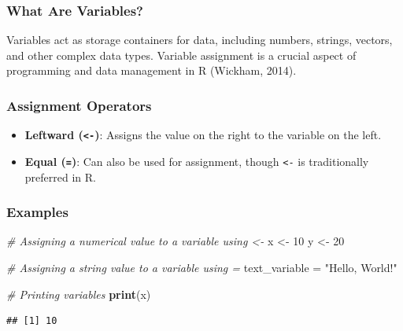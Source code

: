 \documentclass[
  b5paper]{book}
\newenvironment{Shaded}{\begin{snugshade}}{\end{snugshade}}
\newcommand{\CommentTok}[1]{\textcolor[rgb]{0.56,0.35,0.01}{\textit{#1}}}
\newcommand{\DecValTok}[1]{\textcolor[rgb]{0.00,0.00,0.81}{#1}}
\newcommand{\FunctionTok}[1]{\textcolor[rgb]{0.13,0.29,0.53}{\textbf{#1}}}
\newcommand{\NormalTok}[1]{#1}
\newcommand{\OtherTok}[1]{\textcolor[rgb]{0.56,0.35,0.01}{#1}}
\newcommand{\StringTok}[1]{\textcolor[rgb]{0.31,0.60,0.02}{#1}}
\providecommand{\tightlist}{%
  \setlength{\itemsep}{0pt}\setlength{\parskip}{0pt}}
\begin{document}
\hypertarget{what-are-variables}{%
\subsubsection*{What Are Variables?}\label{what-are-variables}}

Variables act as storage containers for data, including numbers, strings, vectors, and other complex data types. Variable assignment is a crucial aspect of programming and data management in R (Wickham, 2014).

\hypertarget{assignment-operators}{%
\subsubsection*{Assignment Operators}\label{assignment-operators}}

\begin{itemize}
\tightlist
\item
  \textbf{Leftward (\texttt{\textless{}-})}: Assigns the value on the right to the variable on the left.
\item
  \textbf{Equal (\texttt{=})}: Can also be used for assignment, though \texttt{\textless{}-} is traditionally preferred in R.
\end{itemize}

\hypertarget{examples-1}{%
\subsubsection*{Examples}\label{examples-1}}

\begin{Shaded}
\begin{Highlighting}[]
\CommentTok{\# Assigning a numerical value to a variable using \textless{}{-}}
\NormalTok{x }\OtherTok{\textless{}{-}} \DecValTok{10}
\NormalTok{y }\OtherTok{\textless{}{-}} \DecValTok{20}

\CommentTok{\# Assigning a string value to a variable using =}
\NormalTok{text\_variable }\OtherTok{=} \StringTok{"Hello, World!"}

\CommentTok{\# Printing variables}
\FunctionTok{print}\NormalTok{(x)}
\end{Highlighting}
\end{Shaded}

\begin{verbatim}
## [1] 10
\end{verbatim}
\end{document}
